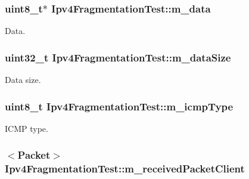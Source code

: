 \subsubsection[{\texorpdfstring{m\+\_\+data}{m_data}}]{\setlength{\rightskip}{0pt plus 5cm}uint8\+\_\+t$\ast$ Ipv4\+Fragmentation\+Test\+::m\+\_\+data\hspace{0.3cm}{\ttfamily [private]}}\hypertarget{classIpv4FragmentationTest_a0560883722435de42b7fcb188ef29586}{}\label{classIpv4FragmentationTest_a0560883722435de42b7fcb188ef29586}


Data. 

\subsubsection[{\texorpdfstring{m\+\_\+data\+Size}{m_dataSize}}]{\setlength{\rightskip}{0pt plus 5cm}uint32\+\_\+t Ipv4\+Fragmentation\+Test\+::m\+\_\+data\+Size\hspace{0.3cm}{\ttfamily [private]}}\hypertarget{classIpv4FragmentationTest_ac2d67ec7308b06170caa50497ac634a9}{}\label{classIpv4FragmentationTest_ac2d67ec7308b06170caa50497ac634a9}


Data size. 

\subsubsection[{\texorpdfstring{m\+\_\+icmp\+Type}{m_icmpType}}]{\setlength{\rightskip}{0pt plus 5cm}uint8\+\_\+t Ipv4\+Fragmentation\+Test\+::m\+\_\+icmp\+Type\hspace{0.3cm}{\ttfamily [private]}}\hypertarget{classIpv4FragmentationTest_a2ee305a2995a09b8b2faf2ecf700c90d}{}\label{classIpv4FragmentationTest_a2ee305a2995a09b8b2faf2ecf700c90d}


I\+C\+MP type. 

\subsubsection[{\texorpdfstring{m\+\_\+received\+Packet\+Client}{m_receivedPacketClient}}]{$<${\bf Packet}$>$ Ipv4\+Fragmentation\+Test\+::m\+\_\+received\+Packet\+Client\hspace{0.3cm}{\ttfamily [private]}}\hypertarget{classIpv4FragmentationTest_a006c01f850b31012c3d7794c488fa4a1}{}\label{classIpv4FragmentationTest_a006c01f850b31012c3d7794c488fa4a1}


